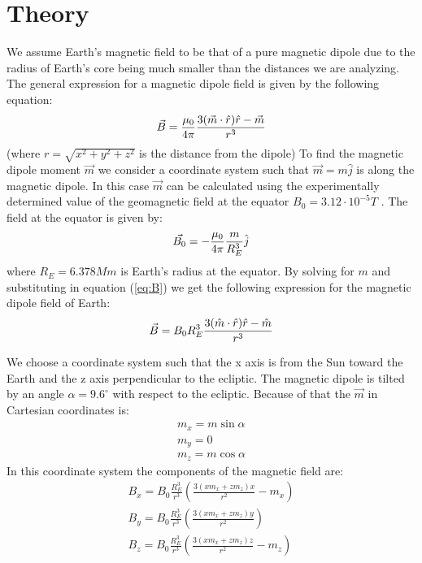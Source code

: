 \documentclass[final,5p,times,twocolumn,authoryear]{elsarticle}
\begin{document}
\section{Theory}
\label{theory}
We assume Earth's magnetic field to be that of a pure magnetic dipole due to the radius of Earth's core being much smaller than the distances we are analyzing.
The general expression for a magnetic dipole field \cite{textbook} is given by the following equation:
\begin{equation} \label{eq:B}
    \\ \vec{B} = \frac{\mu_0}{4\pi} \frac{3(\vec{m}\cdot\hat{r})\hat{r} - \vec{m}}{r^3}
\end{equation}
(where $r = \sqrt{x^2+y^2+z^2}$ is the distance from the dipole)
To find the magnetic dipole moment $\vec{m}$ we consider a coordinate system such that $\vec{m}=m\hat{j}$ is along the magnetic dipole. In this case $\vec{m}$ can be calculated using the experimentally determined value of the geomagnetic field at the equator $B_0 = 3.12 \cdot 10^{-5} \si{T}$ \cite{website}. The field at the equator is given by:
\begin{equation}\label{eq:B0}
    \\ \vec{B_0} = -\frac{\mu_0}{4\pi} \frac{m}{R_E^3} \hat{j}
\end{equation}
where $R_E = 6.378 \si{Mm}$ is Earth's radius at the equator.
By solving for $m$ and substituting in equation (\ref{eq:B}) we get the following expression for the magnetic dipole field of Earth:
\begin{equation} \label{eq:Bf}
    \\ \vec{B} = B_0 R_E^3 \frac{3(\hat{m}\cdot\hat{r})\hat{r} - \hat{m}}{r^3}
\end{equation}

We choose a coordinate system such that the x axis is from the Sun toward the Earth and
the z axis perpendicular to the ecliptic. The magnetic dipole is tilted by an angle $\alpha = 9.6^\circ$ with respect to the ecliptic. Because of that the $\vec{m}$ in Cartesian coordinates is:
\begin{gather}\label{eqs:m}
    m_x = m \sin{\alpha}
    \\
    m_y = 0
    \\
    m_z = m \cos{\alpha}
\end{gather} 
In this coordinate system the components of the magnetic field are:
\begin{gather}\label{eqs:B}
    B_x = B_0\frac{R_E^3}{r^3}\left(\frac{3( x m_x + z m_z)x}{r^2}-m_x\right)\\
    B_y = B_0\frac{R_E^3}{r^3}\left(\frac{3( x m_x + z m_z)y}{r^2}\right)\\
    B_z = B_0\frac{R_E^3}{r^3}\left(\frac{3( x m_x + z m_z)z}{r^2}-m_z\right)
\end{gather} 
\end{document}
